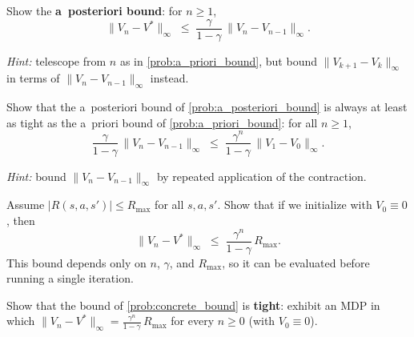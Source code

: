 \documentclass[11pt]{article}
\begin{document}
\begin{exercise}
\label{prob:a_posteriori_bound} Show the \textbf{a~posteriori bound}: for $n \ge 1$,
$$
\|V_n - V^*\|_\infty \;\le\; \frac{\gamma}{1-\gamma}\, \|V_n - V_{n-1}\|_\infty.
$$

\textit{Hint:} telescope from $n$ as in \cref{prob:a_priori_bound}, but bound $\|V_{k+1} - V_k\|_\infty$ in terms of $\|V_n - V_{n-1}\|_\infty$ instead.
\end{exercise}


\begin{exercise}
\label{prob:a_posteriori_tighter} Show that the a~posteriori bound of \cref{prob:a_posteriori_bound} is always at least as tight as the a~priori bound of \cref{prob:a_priori_bound}: for all $n \ge 1$,
$$
\frac{\gamma}{1-\gamma}\, \|V_n - V_{n-1}\|_\infty \;\le\; \frac{\gamma^n}{1-\gamma}\, \|V_1 - V_0\|_\infty.
$$

\textit{Hint:} bound $\|V_n - V_{n-1}\|_\infty$ by repeated application of the contraction.
\end{exercise}


\begin{exercise}
\label{prob:concrete_bound} Assume $|R(s,a,s')| \le R_{\max}$ for all $s,a,s'$. Show that if we initialize with $V_0 \equiv 0$, then
$$
\|V_n - V^*\|_\infty \;\le\; \frac{\gamma^n}{1-\gamma}\, R_{\max}.
$$
This bound depends only on $n$, $\gamma$, and $R_{\max}$, so it can be evaluated before running a single iteration.
\end{exercise}


\begin{exercise}
\label{prob:bound_tight} Show that the bound of \cref{prob:concrete_bound} is \textbf{tight}: exhibit an MDP in which $\|V_n - V^*\|_\infty = \frac{\gamma^n}{1-\gamma}\, R_{\max}$ for every $n \ge 0$ (with $V_0 \equiv 0$).
\end{exercise}


\end{document}
